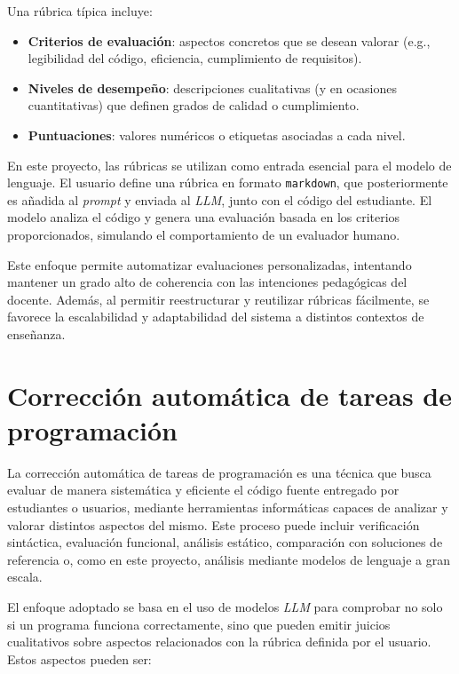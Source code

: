 Una rúbrica típica incluye:

\begin{itemize}
    \item \textbf{Criterios de evaluación}: aspectos concretos que se desean valorar (e.g., legibilidad del código, eficiencia, cumplimiento de requisitos).
    \item \textbf{Niveles de desempeño}: descripciones cualitativas (y en ocasiones cuantitativas) que definen grados de calidad o cumplimiento.
    \item \textbf{Puntuaciones}: valores numéricos o etiquetas asociadas a cada nivel.
\end{itemize}

En este proyecto, las rúbricas se utilizan como entrada esencial para el modelo de lenguaje. El usuario define una rúbrica en formato \texttt{markdown}, que posteriormente es 
añadida al \textit{prompt} y enviada al \textit{LLM}, junto con el código del estudiante. El modelo analiza el código y genera una evaluación basada en los criterios proporcionados, simulando el comportamiento de un evaluador humano.

Este enfoque permite automatizar evaluaciones personalizadas, intentando mantener un grado alto de coherencia con las intenciones pedagógicas del docente. Además, al permitir 
reestructurar y reutilizar rúbricas fácilmente, se favorece la escalabilidad y adaptabilidad del sistema a distintos contextos de enseñanza.

\section{Corrección automática de tareas de programación}

La corrección automática de tareas de programación es una técnica que busca evaluar de manera sistemática y eficiente el código fuente entregado por estudiantes o usuarios, mediante herramientas informáticas capaces de analizar y valorar distintos aspectos del mismo. Este proceso puede incluir verificación sintáctica, evaluación funcional, análisis estático, comparación con soluciones de referencia o, como en este proyecto, análisis mediante modelos de lenguaje a gran escala.

El enfoque adoptado se basa en el uso de modelos \textit{LLM} para comprobar no solo si un programa funciona correctamente, sino que pueden emitir juicios cualitativos sobre aspectos relacionados con la rúbrica definida por el usuario. 
Estos aspectos pueden ser:

